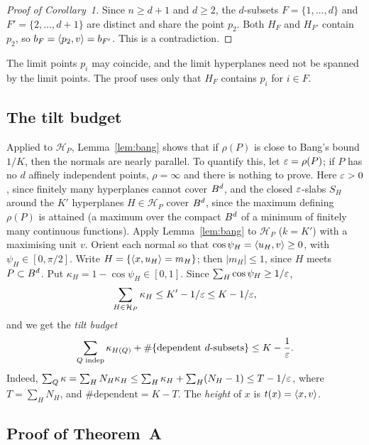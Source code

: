 \documentclass[11pt]{article}
\begin{document}
\begin{proof}[Proof of Corollary~1]
Since $n \ge d + 1$ and $d \ge 2$, the $d$-subsets $F = \{1, \dots, d\}$ and
$F' = \{2, \dots, d+1\}$ are distinct and share the point $p_2$. Both $H_F$ and $H_{F'}$ contain
$p_2$, so $b_F = \langle p_2,v\rangle = b_{F'}$. This is a contradiction.
\end{proof}

\begin{remark}
The limit points $p_i$ may coincide, and the limit hyperplanes need not be spanned by the limit
points. The proof uses only that $H_F$ contains $p_i$ for $i \in F$.
\end{remark}

\subsection{The tilt budget}\label{sec:tilt}

Applied to $\mathcal H_P$, Lemma~\ref{lem:bang} shows that if $\rho(P)$ is close to Bang's bound $1/K$,
then the normals are nearly parallel. To quantify this, let $\varepsilon = \rho(P)$; if $P$ has no $d$ affinely
independent points, $\rho = \infty$ and there is nothing to prove. Here $\varepsilon > 0$, since finitely many
hyperplanes cannot cover $B^d$, and the closed $\varepsilon$-slabs $S_H$ around the $K'$ hyperplanes
$H \in \mathcal H_P$ cover $B^d$, since the maximum defining
$\rho(P)$ is attained (a maximum over the compact $B^d$ of a minimum of finitely many continuous
functions). Apply Lemma~\ref{lem:bang} to $\mathcal H_P$ ($k = K'$) with a maximising unit $v$. Orient each normal so that
$\cos\psi_H = \langle u_H,v\rangle \ge 0$, with $\psi_H \in [0, \pi/2]$. Write
$H = \{\langle x,u_H\rangle = m_H\}$; then $|m_H| \le 1$, since $H$ meets $P \subset B^d$. Put
$\kappa_H = 1 - \cos\psi_H \in [0, 1]$. Since $\sum_H \cos\psi_H \ge 1/\varepsilon$,
\begin{equation}\label{eq:tilt-a}
  \sum_{H \in \mathcal H_P} \kappa_H \le K' - 1/\varepsilon \le K - 1/\varepsilon,
\end{equation}
and we get the \emph{tilt budget}
\begin{equation}\label{eq:tilt}
  \sum_{Q \text{ indep}} \kappa_{H(Q)} + \#\{\text{dependent } d\text{-subsets}\} \le K - \frac1{\varepsilon} .
\end{equation}
Indeed,
$\sum_Q \kappa = \sum_H N_H \kappa_H \le \sum_H \kappa_H + \sum_H (N_H - 1) \le T - 1/\varepsilon$,
where $T = \sum_H N_H$, and $\#\text{dependent} = K - T$.
The \emph{height} of $x$ is $t(x) = \langle x,v\rangle$.

\subsection{Proof of Theorem~A}
\label{sec:A-unified}
\end{document}
